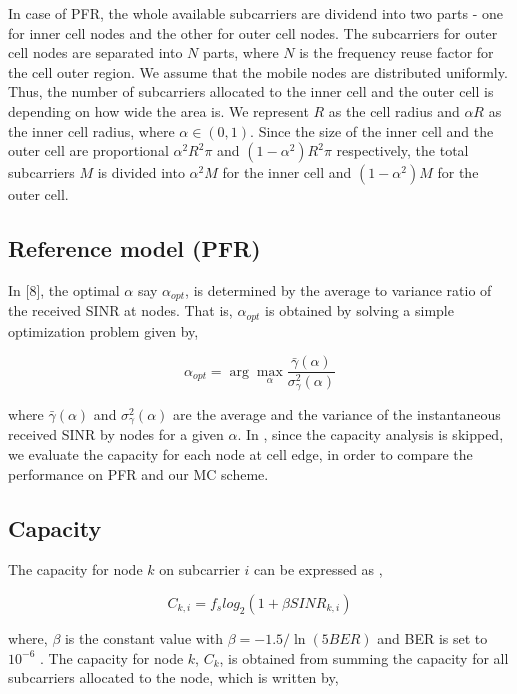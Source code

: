 \documentclass[conference]{IEEEtran}
\begin{document}
In case of PFR, the whole available subcarriers are dividend into two parts - one for inner cell nodes and the other for outer cell nodes. The subcarriers for outer cell nodes are separated into $ N $ parts, where $ N $ is the frequency reuse factor for the cell outer region. We assume that the mobile nodes are distributed uniformly. Thus, the number of subcarriers allocated to the inner cell and the outer cell is depending on how wide the area is. We represent $ R $ as the cell radius and $ \alpha R $ as the inner cell radius, where $ \alpha \in (0,1) $. Since the size of the inner cell and the outer cell are proportional $ \alpha ^2 R^2 \pi $ and $ (1-\alpha ^2 ) R^2 \pi $ respectively, the total subcarriers $ M $ is divided into $ \alpha ^2 M $ for the inner cell and $ (1- \alpha ^2 ) M $ for the outer cell.

\subsection{Reference model (PFR)}
 In [8], the optimal $\alpha$ say $\alpha_{opt}$, is determined by the average to variance ratio of the received SINR at nodes. That is, $\alpha_{opt}$ is obtained by solving a simple optimization problem given by,


\begin{equation}
\alpha_{opt} = \arg \max_{\alpha} \frac{\bar{\gamma}(\alpha)}{\sigma^{2}_{\gamma}(\alpha)}
\label{eq:eqs4}
\end{equation}

\noindent where $ \bar{\gamma}(\alpha) $ and $ \sigma^{2}_{\gamma}(\alpha) $ are the average and the variance of the instantaneous received SINR by nodes for a given $ \alpha $. In \cite{Najjar}, since the capacity analysis is skipped, we evaluate the capacity for each node at cell edge, in order to compare the performance on PFR and our MC scheme.


\subsection{Capacity}

The capacity for node $ k $ on subcarrier $ i $ can be expressed as \cite{Shen},


\begin{equation}
 C_{k,i} = f_s  log_2(1 + \beta SINR_{k,i})
\label{eq:eqs5}
\end{equation}


\noindent where, $\beta$ is the constant value with $ \beta = -1.5 / \ln(5 BER) $ and BER is set to $ 10^{-6} $ \cite{Lei}. The capacity for node $ k $, $C_k $, is obtained from summing the capacity for all subcarriers allocated to the node, which is written by,
\end{document}
